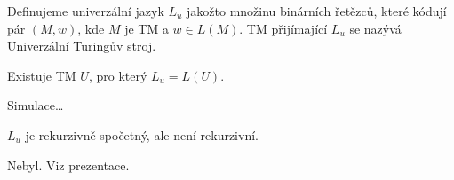 \documentclass[12pt]{article}                   %
\begin{document}
        \begin{definice}
            Definujeme univerzální jazyk $L_u$ jakožto množinu binárních řetězců, které kódují pár $(M, w)$, kde $M$ je TM a $w \in L(M)$. TM přijímající $L_u$ se nazývá Univerzální Turingův stroj.
        \end{definice}

        \begin{veta}
            Existuje TM $U$, pro který $L_u = L(U)$.

            \begin{dukazin}
                Simulace…
            \end{dukazin}
        \end{veta}

        \begin{veta}
            $L_u$ je rekurzivně spočetný, ale není rekurzivní.

            \begin{dukazin}
                Nebyl. Viz prezentace.
            \end{dukazin}
        \end{veta}
\end{document}
